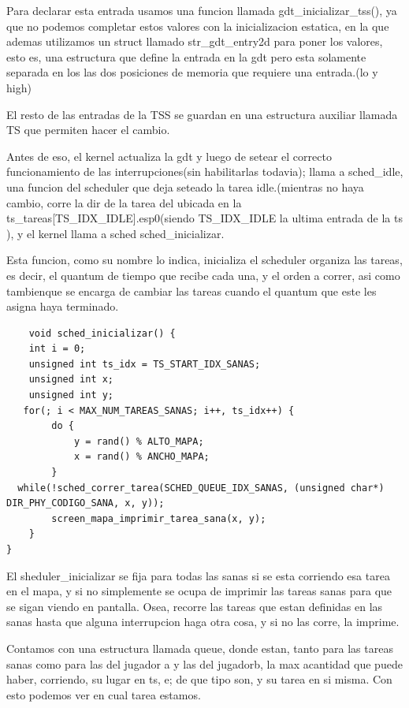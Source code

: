 \documentclass[a4paper]{article}
\newenvironment{codesnippet}{%
	\begin{Sbox}\begin{minipage}{\textwidth}\sffamily\small}%
	{\end{minipage}\end{Sbox}%
		\begin{center}%
		\vspace{-0.4cm}\colorbox{litegrey}{\TheSbox}\end{center}\vspace{0.3cm}}
\begin{document}
Para declarar esta entrada usamos una funcion llamada gdt_inicializar_tss(), ya que no podemos completar estos valores con la inicializacion estatica, en la que ademas utilizamos un struct llamado str_gdt_entry2d para poner los valores, esto es, una estructura que define la entrada en la gdt pero esta solamente separada en los las dos posiciones de memoria que requiere una entrada.(lo y high)

 El resto de las entradas de la TSS se guardan en una estructura auxiliar llamada TS que permiten hacer el cambio. 

Antes de eso, el kernel actualiza la gdt y luego de setear el correcto funcionamiento de las interrupciones(sin habilitarlas todavia); llama a sched_idle, una funcion del scheduler que deja seteado la tarea idle.(mientras no haya cambio, corre la dir de la tarea del ubicada en la ts_tareas[TS_IDX_IDLE].esp0(siendo TS_IDX_IDLE la ultima entrada de la ts ), y el kernel llama a sched sched_inicializar.

Esta funcion, como su nombre lo indica, inicializa el scheduler organiza las tareas, es decir, el quantum de tiempo que recibe cada una, y el orden a correr, asi como tambienque se encarga de cambiar las tareas cuando el quantum que este les asigna haya terminado.



\begin{codesnippet}
\begin{verbatim}		
	void sched_inicializar() {
    int i = 0;
    unsigned int ts_idx = TS_START_IDX_SANAS;
    unsigned int x;
    unsigned int y;
   for(; i < MAX_NUM_TAREAS_SANAS; i++, ts_idx++) {
        do {
            y = rand() % ALTO_MAPA;
            x = rand() % ANCHO_MAPA;
        } 
  while(!sched_correr_tarea(SCHED_QUEUE_IDX_SANAS, (unsigned char*) DIR_PHY_CODIGO_SANA, x, y));
        screen_mapa_imprimir_tarea_sana(x, y);
    }
}
\end{verbatim}
\end{codesnippet}



El sheduler_inicializar se fija para todas las sanas si se esta corriendo esa tarea en el mapa, y si no simplemente se ocupa de imprimir las tareas sanas para que se sigan viendo en pantalla. Osea, recorre las tareas que estan definidas en las sanas hasta que alguna interrupcion haga otra cosa, y si no las corre, la imprime.

Contamos con una estructura llamada queue, donde estan, tanto para las tareas sanas como para las del jugador a y las del jugadorb, la max acantidad que puede haber, corriendo, su lugar en ts, e; de que tipo son, y su tarea en si misma. Con esto podemos ver en cual tarea estamos.
\end{document}
